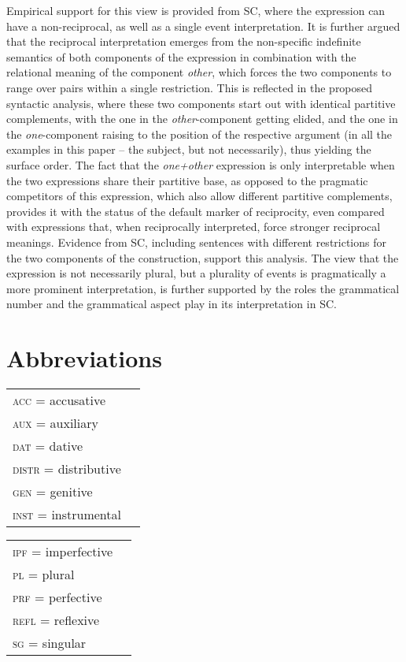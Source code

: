 \documentclass[output=paper,colorlinks,citecolor=brown]{langscibook}
\begin{document}
Empirical support for this view is provided from SC, where the expression can have a non-reciprocal, as well as a single event interpretation. It is further argued that the reciprocal interpretation emerges from the non-specific indefinite semantics of both components of the expression in combination with the relational meaning of the component \textit{other}, which forces the two components to range over pairs within a single restriction. This is reflected in the proposed syntactic analysis, where these two components start out with identical partitive complements, with the one in the \textit{other}-component getting elided, and the one in the \textit{one}-component raising to the position of the respective argument (in all the examples in this paper -- the subject, but not necessarily), thus yielding the surface order. The fact that the \textit{one+other} expression is only interpretable when the two expressions share their partitive base, as opposed to the pragmatic competitors of this expression, which also allow different partitive complements, provides it with the status of the default marker of reciprocity, even compared with expressions that, when reciprocally interpreted, force stronger reciprocal meanings. Evidence from SC, including sentences with different restrictions for the two components 
of the construction, support this analysis. The view that the expression is not necessarily plural, but a plurality of events is pragmatically a more prominent interpretation, is further supported by the roles the grammatical number and the grammatical aspect play in its interpretation in SC.

\section*{Abbreviations}

\begin{tabularx}{.45\textwidth}{lQ}
\textsc{acc} = accusative & \\
\textsc{aux} = auxiliary & \\
\textsc{dat} = dative & \\
\textsc{distr} = distributive & \\
\textsc{gen} = genitive & \\
\textsc{inst} = instrumental & \\

\end{tabularx}
\begin{tabularx}{.45\textwidth}{lQ}

\textsc{ipf} = imperfective & \\
\textsc{pl} = plural & \\
\textsc{prf} = perfective & \\
\textsc{refl} = reflexive & \\
\textsc{sg} = singular & \\

\end{tabularx}
\end{document}
